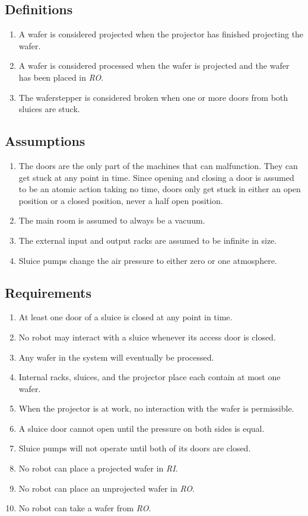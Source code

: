 \subsection{Definitions}
\begin{enumerate}
  \item A wafer is considered projected when the projector has finished projecting the wafer.
  \item A wafer is considered processed when the wafer is projected and the wafer has been placed in \textit{RO}.
  \item The waferstepper is considered broken when one or more doors from both sluices are stuck.
\end{enumerate}

\subsection{Assumptions}
\begin{enumerate}
  \item The doors are the only part of the machines that can malfunction. They can get stuck at any point in time. Since opening and closing a door is assumed to be an atomic action taking no time, doors only get stuck in either an open position or a closed position, never a half open position.
  \item The main room is assumed to always be a vacuum.
  \item The external input and output racks are assumed to be infinite in size.
  \item Sluice pumps change the air pressure to either zero or one atmosphere.
\end{enumerate}

\subsection{Requirements}
\begin{enumerate}
  \item At least one door of a sluice is closed at any point in time.
  \item No robot may interact with a sluice whenever its access door is closed.
  \item Any wafer in the system will eventually be processed.
  \item Internal racks, sluices, and the projector place each contain at most one wafer.
  \item When the projector is at work, no interaction with the wafer is permissible.
  \item A sluice door cannot open until the pressure on both sides is equal.
  \item Sluice pumps will not operate until both of its doors are closed.
  \item No robot can place a projected wafer in \textit{RI}.
  \item No robot can place an unprojected wafer in \textit{RO}.
  \item No robot can take a wafer from \textit{RO}.
\end{enumerate}
